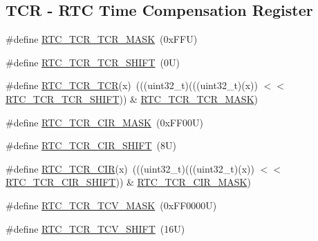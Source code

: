 \subsection*{T\+CR -\/ R\+TC Time Compensation Register}
\begin{DoxyCompactItemize}
\item 
\#define \mbox{\hyperlink{group___r_t_c___register___masks_ga48a96d1de8db1993bfac3ca9d6bdb227}{R\+T\+C\+\_\+\+T\+C\+R\+\_\+\+T\+C\+R\+\_\+\+M\+A\+SK}}~(0x\+F\+F\+U)
\item 
\#define \mbox{\hyperlink{group___r_t_c___register___masks_ga0d8bc8c79b8010b8ebb94562428713fe}{R\+T\+C\+\_\+\+T\+C\+R\+\_\+\+T\+C\+R\+\_\+\+S\+H\+I\+FT}}~(0\+U)
\item 
\#define \mbox{\hyperlink{group___r_t_c___register___masks_gaca21d09697f88aef5b056c81daaa8445}{R\+T\+C\+\_\+\+T\+C\+R\+\_\+\+T\+CR}}(x)~(((uint32\+\_\+t)(((uint32\+\_\+t)(x)) $<$$<$ \mbox{\hyperlink{group___r_t_c___register___masks_ga0d8bc8c79b8010b8ebb94562428713fe}{R\+T\+C\+\_\+\+T\+C\+R\+\_\+\+T\+C\+R\+\_\+\+S\+H\+I\+FT}})) \& \mbox{\hyperlink{group___r_t_c___register___masks_ga48a96d1de8db1993bfac3ca9d6bdb227}{R\+T\+C\+\_\+\+T\+C\+R\+\_\+\+T\+C\+R\+\_\+\+M\+A\+SK}})
\item 
\#define \mbox{\hyperlink{group___r_t_c___register___masks_ga8f198d1dbc7427e1dfabdc4e9f53f8e2}{R\+T\+C\+\_\+\+T\+C\+R\+\_\+\+C\+I\+R\+\_\+\+M\+A\+SK}}~(0x\+F\+F00\+U)
\item 
\#define \mbox{\hyperlink{group___r_t_c___register___masks_ga4b8c9ecf8ed798b8c0173ce122874c5e}{R\+T\+C\+\_\+\+T\+C\+R\+\_\+\+C\+I\+R\+\_\+\+S\+H\+I\+FT}}~(8\+U)
\item 
\#define \mbox{\hyperlink{group___r_t_c___register___masks_ga2425cc5a6f775938d0c0aa5448b96b05}{R\+T\+C\+\_\+\+T\+C\+R\+\_\+\+C\+IR}}(x)~(((uint32\+\_\+t)(((uint32\+\_\+t)(x)) $<$$<$ \mbox{\hyperlink{group___r_t_c___register___masks_ga4b8c9ecf8ed798b8c0173ce122874c5e}{R\+T\+C\+\_\+\+T\+C\+R\+\_\+\+C\+I\+R\+\_\+\+S\+H\+I\+FT}})) \& \mbox{\hyperlink{group___r_t_c___register___masks_ga8f198d1dbc7427e1dfabdc4e9f53f8e2}{R\+T\+C\+\_\+\+T\+C\+R\+\_\+\+C\+I\+R\+\_\+\+M\+A\+SK}})
\item 
\#define \mbox{\hyperlink{group___r_t_c___register___masks_ga920f92da02ac0a6ae0931645600e2405}{R\+T\+C\+\_\+\+T\+C\+R\+\_\+\+T\+C\+V\+\_\+\+M\+A\+SK}}~(0x\+F\+F0000\+U)
\item 
\#define \mbox{\hyperlink{group___r_t_c___register___masks_ga6bcbafe57cdb430da5ee6902e0bcb224}{R\+T\+C\+\_\+\+T\+C\+R\+\_\+\+T\+C\+V\+\_\+\+S\+H\+I\+FT}}~(16\+U)
\item 

\end{DoxyCompactItemize}
